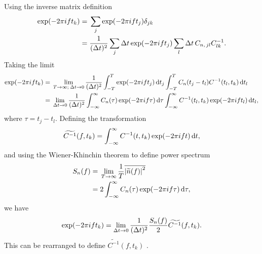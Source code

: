Using the inverse matrix definition
\begin{align}
\exp(-2\pi i f t_k) = {} & \sum_j \exp(-2\pi ift_j) \delta_{jk} \nonumber \\
 = {} & \frac{1}{(\Delta t)^2} \sum_j \Delta t \exp(-2\pi ift_j) \sum_l \Delta t \, C_{n,\,jl}C^{-1}_{lk}.
\end{align}
Taking the limit
\begin{align}
\exp(-2\pi i f t_k) = {} & \lim_{T \rightarrow \infty; \; \Delta t \rightarrow 0} \frac{1}{(\Delta t)^2} \int_{-T}^{T}{\exp(-2\pi ift_j)}\,\mathrm{d}{t_j} \int_{-T}^{T}{C_n(t_j-t_l)C^{-1}(t_l,t_k)}\,\mathrm{d}{t_l} \nonumber \\
 = {} & \lim_{\Delta t \rightarrow 0} \frac{1}{(\Delta t)^2} \int_{-\infty}^{\infty}{C_n(\tau)\exp(-2\pi if\tau)}\,\mathrm{d}{\tau} \int_{-\infty}^{\infty}{C^{-1}(t_l,t_k)\exp(-2\pi if t_l)}\,\mathrm{d}{t_l},
\end{align}
where $\tau = t_j - t_l$. Defining the transformation
\begin{equation}
\widetilde{C^{-1}}(f,t_k) = \int_{-\infty}^{\infty}{C^{-1}(t,t_k)\exp(-2\pi if t)}\,\mathrm{d}{t},
\end{equation}
and using the Wiener-Khinchin theorem to define power spectrum \citep{Cutler1994}
\begin{align}
S_n(f) = {} & \lim_{T \rightarrow \infty} \frac{1}{T} \overline{\left|\widetilde{n}(f)\right|^2} \\
 = {} & 2 \int_{-\infty}^{\infty}{C_n(\tau)\exp(-2\pi i f\tau)}\,\mathrm{d}{\tau},
\end{align}
we have
\begin{equation}
\exp(-2\pi i f t_k) = \lim_{\Delta t \rightarrow 0} \frac{1}{(\Delta t)^2} \frac{S_n(f)}{2} \widetilde{C^{-1}}(f,t_k).
\end{equation}
This can be rearranged to define $\widetilde{C^{-1}}(f,t_k)$ \citep{Finn1992}.

